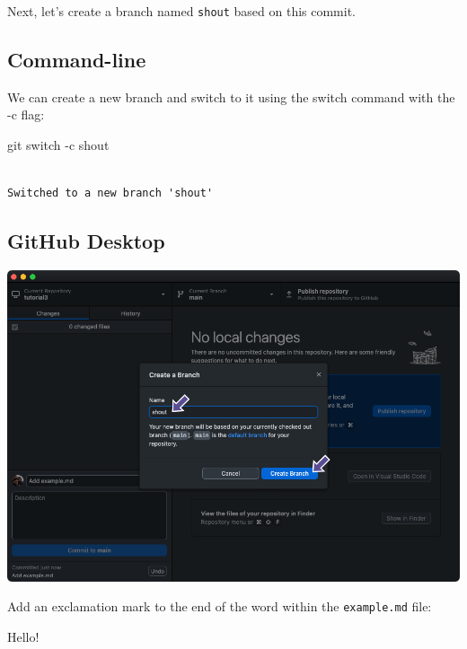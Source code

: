 \documentclass[
  letterpaper,
  DIV=11,
  numbers=noendperiod]{scrartcl}
\newenvironment{Shaded}{\begin{snugshade}}{\end{snugshade}}
\newcommand{\AttributeTok}[1]{\textcolor[rgb]{0.40,0.45,0.13}{#1}}
\newcommand{\FunctionTok}[1]{\textcolor[rgb]{0.28,0.35,0.67}{#1}}
\newcommand{\NormalTok}[1]{\textcolor[rgb]{0.00,0.23,0.31}{#1}}
\begin{document}
Next, let's create a branch named \texttt{shout} based on this commit.

\subsection{Command-line}

We can create a new branch and switch to it using the switch command
with the -c flag:

\begin{Shaded}
\begin{Highlighting}[]
\FunctionTok{git}\NormalTok{ switch }\AttributeTok{{-}c}\NormalTok{ shout}
\end{Highlighting}
\end{Shaded}

\begin{verbatim}

Switched to a new branch 'shout'
\end{verbatim}

\subsection{GitHub Desktop}

\includegraphics{images/image29.png}

Add an exclamation mark to the end of the word within the
\texttt{example.md} file:

\begin{tcolorbox}[enhanced jigsaw, opacitybacktitle=0.6, arc=.35mm, toprule=.15mm, leftrule=.75mm, colbacktitle=quarto-callout-note-color!10!white, bottomrule=.15mm, rightrule=.15mm, opacityback=0, title=\textcolor{quarto-callout-note-color}{\faInfo}\hspace{0.5em}{example.md}, toptitle=1mm, breakable, left=2mm, colback=white, titlerule=0mm, bottomtitle=1mm, coltitle=black, colframe=quarto-callout-note-color-frame]

Hello!

\end{tcolorbox}
\end{document}
